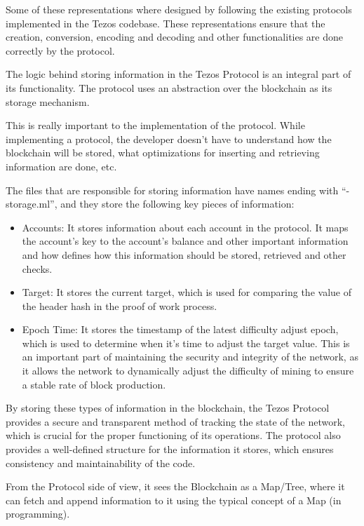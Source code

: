 Some of these representations where designed by following the existing protocols implemented in the Tezos codebase. These representations ensure that the creation, conversion, encoding and decoding and other functionalities are done correctly by the protocol.

The logic behind storing information in the Tezos Protocol is an integral part of its functionality. The protocol uses an abstraction over the blockchain as its storage mechanism. 

This is really important to the implementation of the protocol. While implementing a protocol, the developer doesn't have to understand how the blockchain will be stored, what optimizations for inserting and retrieving information are done, etc.

The files that are responsible for storing information have names ending with ``-storage.ml'', and they store the following key pieces of information:

\begin{itemize}
    \item Accounts: It stores information about each account in the protocol. It maps the account's key to the account's balance and other important information and how defines how this information should be stored, retrieved and other checks.

    \item Target: It stores the current target, which is used for comparing the value of the header hash in the proof of work process.

    \item Epoch Time: It stores the timestamp of the latest difficulty adjust epoch, which is used to determine when it's time to adjust the target value. This is an important part of maintaining the security and integrity of the network, as it allows the network to dynamically adjust the difficulty of mining to ensure a stable rate of block production.
\end{itemize}

By storing these types of information in the blockchain, the Tezos Protocol provides a secure and transparent method of tracking the state of the network, which is crucial for the proper functioning of its operations. The protocol also provides a well-defined structure for the information it stores, which ensures consistency and maintainability of the code.

From the Protocol side of view, it sees the Blockchain as a Map/Tree, where it can fetch and append information to it using the typical concept of a Map (in programming).

